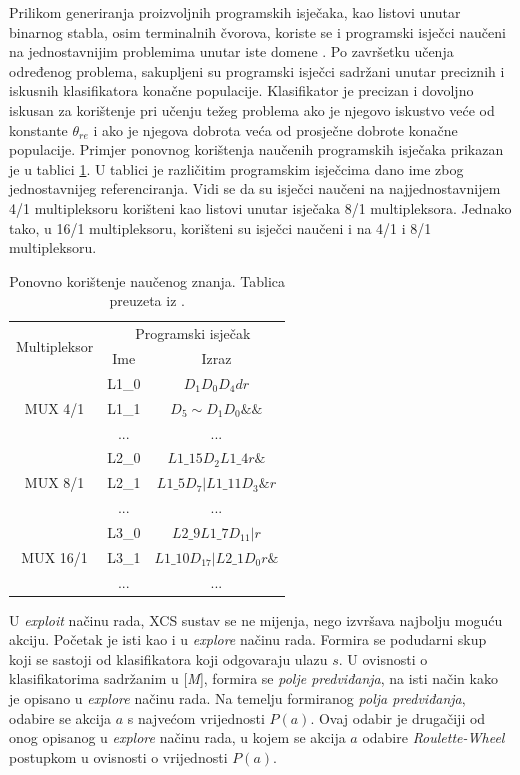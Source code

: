 \documentclass[times, utf8, zavrsni]{fer}
\begin{document}
Prilikom generiranja proizvoljnih programskih isječaka, kao listovi unutar binarnog stabla, osim terminalnih čvorova, koriste se i programski isječci naučeni na jednostavnijim problemima unutar iste domene \citep{4}.
Po završetku učenja određenog problema, sakupljeni su programski isječci sadržani unutar preciznih i iskusnih klasifikatora konačne populacije.
Klasifikator je precizan i dovoljno iskusan za korištenje pri učenju težeg problema ako je njegovo iskustvo veće od konstante $\theta_{re}$ i ako je njegova dobrota veća od prosječne dobrote konačne populacije.
Primjer ponovnog korištenja naučenih programskih isječaka prikazan je u tablici \ref{tbl:reuse}.
U tablici je različitim programskim isječcima dano ime zbog jednostavnijeg referenciranja.
Vidi se da su isječci naučeni na najjednostavnijem 4/1 multipleksoru korišteni kao listovi unutar isječaka 8/1 multipleksora.
Jednako tako, u 16/1 multipleksoru, korišteni su isječci naučeni i na 4/1 i 8/1 multipleksoru.
\begin{table}[!htb]
    \caption{Ponovno korištenje naučenog znanja. Tablica preuzeta iz \citep{4}.}
    \label{tbl:reuse}
    \centering
    \begin{tabular}{c | c | c}
        \multirow{2}{*}{Multipleksor} & \multicolumn{2}{c}{Programski isječak} \\
        & Ime & Izraz \\ \hline
        \multirow{3}{*}{MUX 4/1} & L1\_0 & $D_{1}D_{0}D_{4}dr$ \\
        & L1\_1 & $D_{5}\sim D_{1}D_{0}\&\&$ \\
        & ... & ... \\ \hline
        \multirow{3}{*}{MUX 8/1} & L2\_0 & $L1\_15D_{2}L1\_4r\&$ \\
        & L2\_1 & $L1\_5D_{7}|L1\_11D_{3}\&r$ \\
        & ... & ... \\ \hline
        \multirow{3}{*}{MUX 16/1} & L3\_0 & $L2\_9L1\_7D_{11}|r$ \\
        & L3\_1 & $L1\_10D_{17}|L2\_1D_{0}r\&$ \\
        & ... & ... \\
    \end{tabular}
\end{table}

U \emph{exploit} načinu rada, XCS sustav se ne mijenja, nego izvršava najbolju moguću akciju.
Početak je isti kao i u \emph{explore} načinu rada.
Formira se podudarni skup koji se sastoji od klasifikatora koji odgovaraju ulazu $s$.
U ovisnosti o klasifikatorima sadržanim u [\emph{M}], formira se \emph{polje predviđanja}, na isti način kako je opisano u \emph{explore} načinu rada.
Na temelju formiranog \emph{polja predviđanja}, odabire se akcija $a$ s najvećom vrijednosti $P(a)$.
Ovaj odabir je drugačiji od onog opisanog u \emph{explore} načinu rada, u kojem se akcija $a$ odabire \emph{Roulette-Wheel} postupkom u ovisnosti o vrijednosti $P(a)$.
\end{document}
